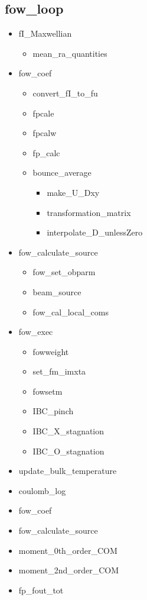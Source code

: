 \documentclass[11pt]{article}
\begin{document}
\subsection{fow\_loop}
  \begin{itemize}
  \item
    fI\_Maxwellian
    \begin{itemize}
    \item
      mean\_ra\_quantities
    \end{itemize}
  \item
    fow\_coef
    \begin{itemize}
    \item
      convert\_fI\_to\_fu
    \item
      fpcale
    \item
      fpcalw
    \item
      fp\_calc
    \item
      bounce\_average
      \begin{itemize}
      \item
        make\_U\_Dxy
      \item
        transformation\_matrix
      \item
	interpolate\_D\_unlessZero
      \end{itemize}
    \end{itemize}
  \item
    fow\_calculate\_source
    \begin{itemize}
    \item
      fow\_set\_obparm
    \item
      beam\_source
    \item
      fow\_cal\_local\_coms
    \end{itemize}
  \item
    fow\_exec
    \begin{itemize}
    \item
      fowweight
    \item
      set\_fm\_imxta
    \item
      fowsetm
    \item
      IBC\_pinch
    \item
      IBC\_X\_stagnation
    \item
      IBC\_O\_stagnation
    \end{itemize}
  \item
    update\_bulk\_temperature
  \item
    coulomb\_log
  \item
    fow\_coef
  \item
    fow\_calculate\_source
  \item
    moment\_0th\_order\_COM
  \item
    moment\_2nd\_order\_COM
  \item
    fp\_fout\_tot
  \end{itemize}
\end{document}
